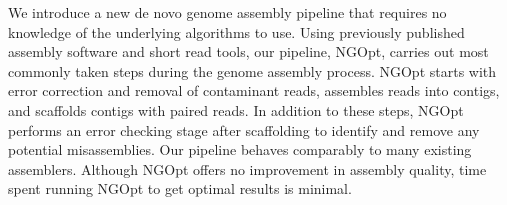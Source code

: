 \documentclass{bioinfo}
\begin{document}
We introduce a new de novo genome assembly pipeline that requires no knowledge
of the underlying algorithms to use. Using previously 
published assembly software and short read tools, our pipeline, NGOpt, carries out
most commonly taken steps during the genome assembly process. NGOpt starts with error correction
and removal of contaminant reads, assembles reads into contigs, and scaffolds
contigs with paired reads. In addition to these steps, NGOpt performs an 
error checking stage after scaffolding to identify and remove any potential misassemblies. 
Our pipeline behaves comparably to many existing assemblers. Although NGOpt offers no improvement
in assembly quality, time spent running NGOpt to get optimal results is minimal. 

\end{document}
